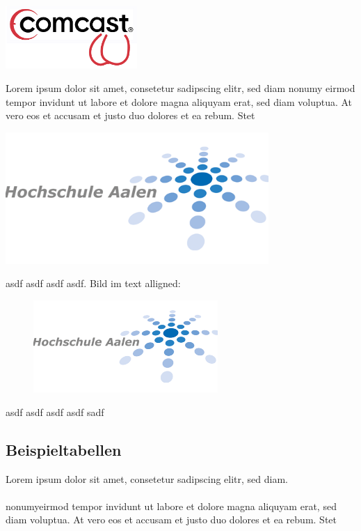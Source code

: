 \begin{center}
	\includegraphics[width=5cm]{images/company_logo.png}
\end{center}

Lorem ipsum dolor sit amet, consetetur sadipscing elitr, sed diam nonumy eirmod tempor invidunt ut labore et dolore magna aliquyam erat, sed diam voluptua. At vero eos et accusam et justo duo dolores et ea rebum. Stet
\begin{center}
	\includegraphics[width=10cm]{images/institute_logo.png}
\end{center}


asdf asdf asdf asdf. Bild im text alligned:

\begin{figure}\centering
    \includegraphics[width=7cm]{./images/institute_logo.png}
\end{figure}

asdf asdf asdf asdf sadf

\clearpage

\subsection{Beispieltabellen}
Lorem ipsum dolor sit amet, consetetur sadipscing elitr, sed diam.\\\\
 nonumyeirmod tempor invidunt ut labore et dolore magna aliquyam erat, sed diam voluptua. At vero eos et accusam et justo duo dolores et ea rebum. Stet


